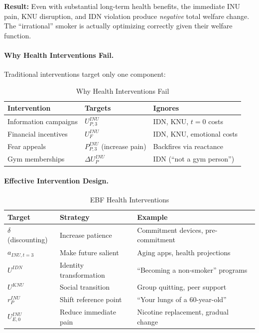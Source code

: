 \textbf{Result:} Even with substantial long-term health benefits, 
the immediate INU pain, KNU disruption, and IDN violation produce 
\emph{negative} total welfare change. The ``irrational'' smoker is 
actually optimizing correctly given their welfare function.

\paragraph{Why Health Interventions Fail.}
Traditional interventions target only one component:

\begin{table}[htbp]
\centering
\caption{Why Health Interventions Fail}
\label{tab:health-failures}
\renewcommand{\arraystretch}{1.3}
\begin{tabular}{@{}lll@{}}
\toprule
\textbf{Intervention} & \textbf{Targets} & \textbf{Ignores} \\
\midrule
Information campaigns & $U^{INU}_{P,3}$ & IDN, KNU, $t=0$ costs \\
Financial incentives & $U^{INU}_{F}$ & IDN, KNU, emotional costs \\
Fear appeals & $P^{INU}_{P,3}$ (increase pain) & Backfires via reactance \\
Gym memberships & $\Delta U^{INU}_P$ & IDN (``not a gym person'') \\
\bottomrule
\end{tabular}
\end{table}

\paragraph{Effective Intervention Design.}

\begin{table}[htbp]
\centering
\caption{EBF Health Interventions}
\label{tab:health-interventions}
\renewcommand{\arraystretch}{1.3}
\begin{tabular}{@{}llp{5cm}@{}}
\toprule
\textbf{Target} & \textbf{Strategy} & \textbf{Example} \\
\midrule
$\delta$ (discounting) & Increase patience & Commitment devices, pre-commitment \\
$a_{INU,t=3}$ & Make future salient & Aging apps, health projections \\
$U^{IDN}$ & Identity transformation & ``Becoming a non-smoker'' programs \\
$U^{KNU}$ & Social transition & Group quitting, peer support \\
$r^{INU}_{P}$ & Shift reference point & ``Your lungs of a 60-year-old'' \\
$U^{INU}_{E,0}$ & Reduce immediate pain & Nicotine replacement, gradual change \\
\bottomrule
\end{tabular}
\end{table}

